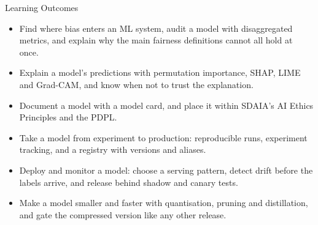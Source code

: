 \begin{frame}{Learning Outcomes}
    \begin{itemize}
        \setlength\itemsep{0.55em}
        \item Find where bias enters an ML system, audit a model with disaggregated metrics, and explain why the main
              fairness definitions cannot all hold at once.
        \item Explain a model's predictions with permutation importance, SHAP, LIME and Grad-CAM, and know when not to
              trust the explanation.
        \item Document a model with a model card, and place it within SDAIA's AI Ethics Principles and the PDPL.
        \item Take a model from experiment to production: reproducible runs, experiment tracking, and a registry with
              versions and aliases.
        \item Deploy and monitor a model: choose a serving pattern, detect drift before the labels arrive, and release
              behind shadow and canary tests.
        \item Make a model smaller and faster with quantisation, pruning and distillation, and gate the compressed
              version like any other release.
    \end{itemize}
\end{frame}

